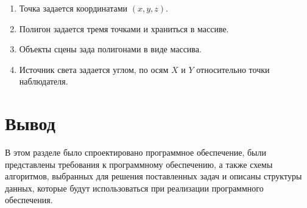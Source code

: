 \begin{enumerate}
	\item Точка задается координатами $(x, y, z)$.
	\item Полигон задается тремя точками и храниться в массиве.
	\item Объекты сцены зада полигонами в виде массива.
	\item Источник света задается углом, по осям $X$ и $Y$ относительно точки наблюдателя. 
\end{enumerate}

\section*{Вывод}

В этом разделе было спроектировано программное обеспечение, были представлены требования к программному обеспечению, а также схемы алгоритмов, выбранных для решения поставленных задач и описаны структуры данных, которые будут использоваться при реализации программного обеспечения.

